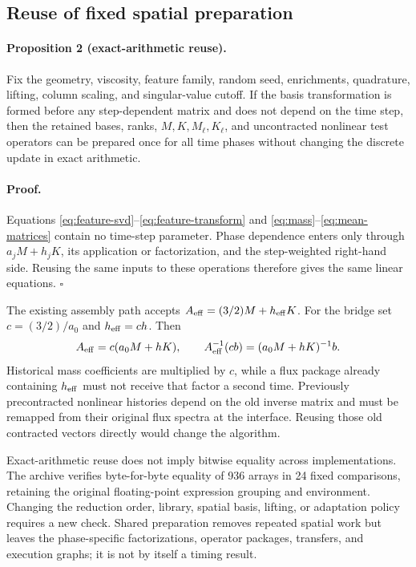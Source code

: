 \subsection{Reuse of fixed spatial preparation}

\paragraph{Proposition 2 (exact-arithmetic reuse).}
Fix the geometry, viscosity, feature family, random seed, enrichments,
quadrature, lifting, column scaling, and singular-value cutoff. If the
basis transformation is formed before any step-dependent matrix and
does not depend on the time step, then the retained bases, ranks,
\(M,K,M_\ell,K_\ell\), and uncontracted nonlinear test operators
can be prepared once for all time phases without changing the
discrete update in exact arithmetic.

\paragraph{Proof.}
Equations \eqref{eq:feature-svd}--\eqref{eq:feature-transform} and
\eqref{eq:mass}--\eqref{eq:mean-matrices} contain no time-step
parameter. Phase dependence enters only through \(a_jM+h_jK\),
its application or factorization, and the step-weighted right-hand
side. Reusing the same inputs to these operations therefore gives
the same linear equations. \hfill\(\square\)

The existing assembly path accepts
\(A_{\rm eff}=(3/2)M+h_{\rm eff}K\). For the bridge set
\(c=(3/2)/a_0\) and \(h_{\rm eff}=ch\). Then
\begin{equation}
 A_{\rm eff}=c(a_0M+hK),\qquad
 A_{\rm eff}^{-1}(c b)=(a_0M+hK)^{-1}b.
 \label{eq:bridge-reuse}
\end{equation}
Historical mass coefficients are multiplied by \(c\), while a
flux package already containing \(h_{\rm eff}\) must not receive
that factor a second time. Previously precontracted nonlinear
histories depend on the old inverse matrix and must be remapped from
their original flux spectra at the interface. Reusing those old
contracted vectors directly would change the algorithm.

Exact-arithmetic reuse does not imply bitwise equality across
implementations. The archive verifies byte-for-byte equality of 936
arrays in 24 fixed comparisons, retaining the original floating-point
expression grouping and environment. Changing the reduction order,
library, spatial basis, lifting, or adaptation policy requires a new
check. Shared preparation removes repeated spatial work but leaves
the phase-specific factorizations, operator packages, transfers, and
execution graphs; it is not by itself a timing result.

